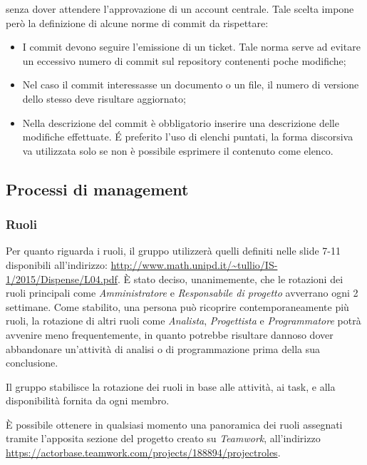 \documentclass[a4paper]{article}
\begin{document}
		senza dover attendere l'approvazione di un account centrale. Tale scelta impone però la definizione di alcune norme
		di commit da rispettare:
		\begin{itemize}
			\item I commit devono seguire l'emissione di un ticket. Tale norma serve ad evitare un eccessivo numero di
			 commit sul repository contenenti poche modifiche;
			\item Nel caso il commit interessasse un documento o un file, il numero di versione dello stesso deve risultare
			 aggiornato;
			\item Nella descrizione del commit è obbligatorio inserire una descrizione delle modifiche effettuate. \'E preferito
			l'uso di elenchi puntati, la forma discorsiva va utilizzata solo se non è possibile esprimere il contenuto come
			elenco.
		\end{itemize}
	\subsection{Processi di management}
	\subsubsection{Ruoli}
		Per quanto riguarda i ruoli, il gruppo utilizzerà quelli definiti nelle slide 7-11 disponibili all'indirizzo:
		\url{http://www.math.unipd.it/~tullio/IS-1/2015/Dispense/L04.pdf}. È stato deciso, unanimemente, che le rotazioni dei ruoli principali
		come \emph{Amministratore} e \emph{Responsabile di progetto} avverrano ogni 2 settimane. Come stabilito, una persona può ricoprire
		contemporaneamente più ruoli, la rotazione di altri ruoli come \emph{Analista}, \emph{Progettista} e \emph{Programmatore} potrà avvenire
		meno frequentemente, in quanto potrebbe risultare dannoso dover abbandonare un'attività di analisi o di programmazione prima della sua
		conclusione.

		Il gruppo stabilisce la rotazione dei ruoli in base alle attività, ai task, e alla disponibilità fornita da ogni membro.

		È possibile ottenere in qualsiasi momento una panoramica dei ruoli assegnati tramite l'apposita sezione del
		progetto creato su \emph{Teamwork}, all'indirizzo\\ \url{https://actorbase.teamwork.com/projects/188894/projectroles}.
\end{document}
